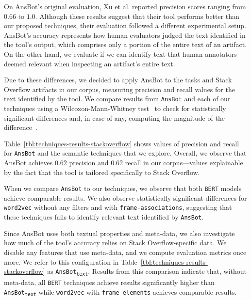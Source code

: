 On \acs{AnsBot}'s original evaluation, Xu et al. reported precision scores ranging from $0.66$ to $1.0$. 
Although these results suggest that their tool performs better than our proposed techniques, their evaluation followed a different experimental setup. 
\acs{AnsBot}'s accuracy represents how human evaluators judged the text identified in the tool's output, which comprises only a portion of the entire text of an artifact. On the other hand, 
we evaluate if we can identify text that human annotators deemed relevant when inspecting an artifact's entire text.



Due to these differences, we decided to apply \acs{AnsBot} to the tasks and Stack Overflow artifacts in our corpus, measuring precision and recall values for the text identified by the tool. 
We compare results from \texttt{AnsBot} and each of our techniques using
a Wilcoxon-Mann-Whitney test~\cite{mannWhitneyU} to check for statistically significant differences and, in case of any, computing the magnitude of the difference~\cite{cohen2013statistical}. 



Table~\ref{tbl:techniques-results-stackoverflow} shows values of precision and recall for  \texttt{AnsBot} and the semantic techniques that we explore. 
Overall, we observe that \acs{AnsBot} achieves 0.62 precision and 0.62 recall in our corpus---values explainable by the fact that the tool is tailored specifically to Stack Overflow.



When we compare \texttt{AnsBot} to our techniques, we observe that 
both \texttt{BERT} models achieve comparable results.
We also observe statistically significant differences for 
\texttt{word2vec} without any filters and with \texttt{frame-associations}, suggesting that these techniques
fails to identify relevant text identified by \texttt{AnsBot}.






Since \acs{AnsBot} uses both textual properties and meta-data, 
we also investigate how much of the tool's accuracy relies on Stack Overflow-specific data.
We disable any features that use meta-data, and we compute evaluation metrics once more.
We refer to this configuration in Table~\ref{tbl:techniques-results-stackoverflow} as \texttt{AnsBot\textsubscript{text}}.
Results from this comparison indicate that, without meta-data, all \texttt{BERT} techniques
achieve results 
significantly higher than  \texttt{AnsBot\textsubscript{text}}
while \texttt{word2vec} with \texttt{frame-elements} achieves comparable results.




